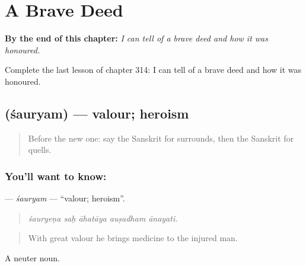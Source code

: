 
\chapter{A Brave Deed}
\label{ch:sa-a-brave-deed}

\begin{chapteropening}
\textbf{By the end of this chapter:} \emph{I can tell of a brave deed and how it was honoured.}

Complete the last lesson of chapter 314: I can tell of a brave deed and how it was honoured.
\end{chapteropening}

\section[\texorpdfstring{\sk{शौर्यम्} (śauryam)}{शौर्यम् (śauryam)}]{ (śauryam) — valour; heroism}

\label{lesson:SA-C314-sauryam}



\begin{quote}
Before the new one: say the Sanskrit for surrounds, then the Sanskrit for quells.
\end{quote}

\subsection*{You'll want to know: }
\textbf{} — \emph{śauryam} — \textquotedblleft{}valour; heroism\textquotedblright{}.

\begin{quote}
    
\end{quote}

\begin{quote}
\emph{śauryeṇa saḥ āhatāya auṣadham ānayati.}
\end{quote}

\begin{quote}
With great valour he brings medicine to the injured man.
\end{quote}

A neuter noun.

